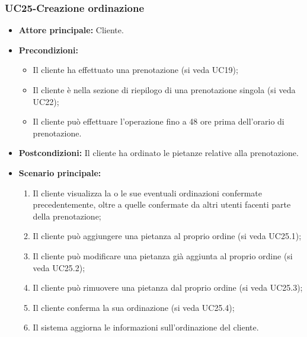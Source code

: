 \subsubsection{UC25-Creazione ordinazione}
\begin{itemize}
\item \textbf{Attore principale:} Cliente.
\item \textbf{Precondizioni:} 
\begin{itemize}
    \item Il cliente ha effettuato una prenotazione (si veda UC19);
    \item Il cliente è nella sezione di riepilogo di una prenotazione singola (si veda UC22);
    \item Il cliente può effettuare l'operazione fino a 48 ore prima dell'orario di prenotazione.
\end{itemize}
\item \textbf{Postcondizioni:} Il cliente ha ordinato le pietanze relative alla prenotazione.
\item \textbf{Scenario principale:}
\begin{enumerate}
    \item Il cliente visualizza la o le sue eventuali ordinazioni confermate precedentemente, oltre a quelle confermate da altri utenti facenti parte della prenotazione;
    \item Il cliente può aggiungere una pietanza al proprio ordine (si veda UC25.1);
    \item Il cliente può modificare una pietanza già aggiunta al proprio ordine (si veda UC25.2);
    \item Il cliente può rimuovere una pietanza dal proprio ordine (si veda UC25.3);
    \item Il cliente conferma la sua ordinazione (si veda UC25.4);
    \item Il sistema aggiorna le informazioni sull'ordinazione del cliente.
\end{enumerate}
\end{itemize}

